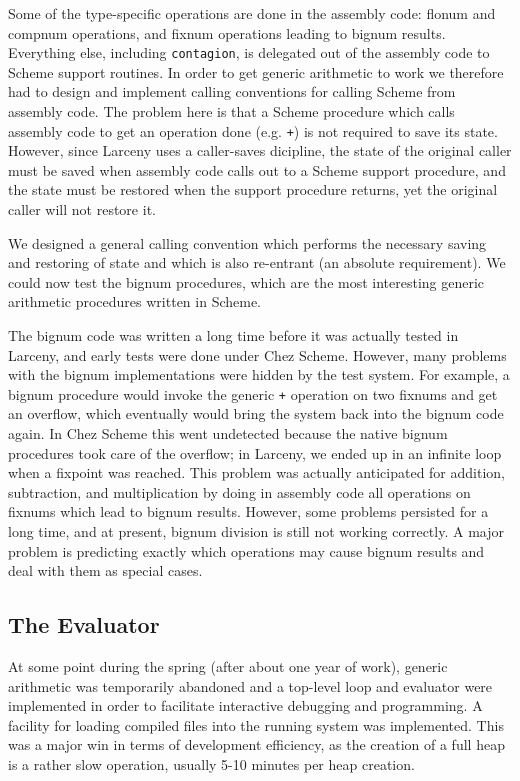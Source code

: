 Some of the type-specific operations are done in the assembly code: flonum and
compnum operations, and fixnum operations leading to bignum results.
Everything else, including {\tt contagion}, is delegated out of the assembly
code to Scheme support routines. In order to get generic arithmetic to work
we therefore had to design and implement calling conventions for calling
Scheme from assembly code. The problem here is that a Scheme procedure which
calls assembly code to get an operation done (e.g. {\tt +}) is not required
to save its state. However, since Larceny uses a caller-saves dicipline, the
state of the original caller must be saved when assembly code calls out
to a Scheme support procedure, and the state must be restored when the
support procedure returns, yet the original caller will not restore it.

We designed a general calling convention which performs the necessary saving
and restoring of state and which is also re-entrant (an absolute
requirement).  We could now test the bignum procedures, which are the most
interesting generic arithmetic procedures written in Scheme.

The bignum code was written a long time before it was actually tested in
Larceny, and early tests were done under Chez Scheme. However, many problems
with the bignum implementations were hidden by the test system. For example,
a bignum procedure would invoke the generic {\tt +} operation on two fixnums
and get an overflow, which eventually would bring the system back into the
bignum code again. In Chez Scheme this went undetected because the native
bignum procedures took care of the overflow; in Larceny, we ended up in an
infinite loop when a fixpoint was reached. This problem was actually
anticipated for addition, subtraction, and multiplication by doing in
assembly code all operations on fixnums which lead to bignum results.
However, some problems persisted for a long time, and at present, bignum
division is still not working correctly. A major problem is predicting
exactly which operations may cause bignum results and deal with them as
special cases.

\subsection{The Evaluator}

At some point during the spring (after about one year of work), generic
arithmetic was temporarily abandoned and a top-level loop and evaluator were
implemented in order to facilitate interactive debugging and programming.  A
facility for loading compiled files into the running system was implemented.
This was a major win in terms of development efficiency, as the creation of
a full heap is a rather slow operation, usually 5-10 minutes per heap
creation.

